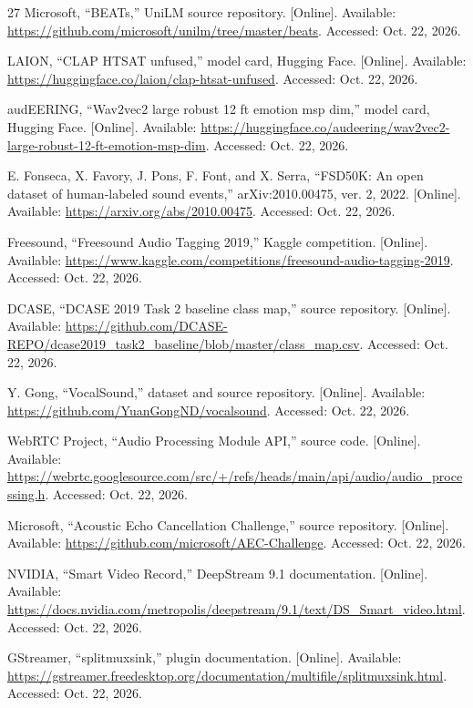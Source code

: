 \begin{thebibliography}{27}
Microsoft, ``BEATs,'' UniLM source repository. [Online]. Available: \url{https://github.com/microsoft/unilm/tree/master/beats}. Accessed: Oct. 22, 2026.

LAION, ``CLAP HTSAT unfused,'' model card, Hugging Face. [Online]. Available: \url{https://huggingface.co/laion/clap-htsat-unfused}. Accessed: Oct. 22, 2026.

audEERING, ``Wav2vec2 large robust 12 ft emotion msp dim,'' model card, Hugging Face. [Online]. Available: \url{https://huggingface.co/audeering/wav2vec2-large-robust-12-ft-emotion-msp-dim}. Accessed: Oct. 22, 2026.

E. Fonseca, X. Favory, J. Pons, F. Font, and X. Serra, ``FSD50K: An open dataset of human-labeled sound events,'' arXiv:2010.00475, ver. 2, 2022. [Online]. Available: \url{https://arxiv.org/abs/2010.00475}. Accessed: Oct. 22, 2026.

Freesound, ``Freesound Audio Tagging 2019,'' Kaggle competition. [Online]. Available: \url{https://www.kaggle.com/competitions/freesound-audio-tagging-2019}. Accessed: Oct. 22, 2026.

DCASE, ``DCASE 2019 Task 2 baseline class map,'' source repository. [Online]. Available: \url{https://github.com/DCASE-REPO/dcase2019_task2_baseline/blob/master/class_map.csv}. Accessed: Oct. 22, 2026.

Y. Gong, ``VocalSound,'' dataset and source repository. [Online]. Available: \url{https://github.com/YuanGongND/vocalsound}. Accessed: Oct. 22, 2026.

WebRTC Project, ``Audio Processing Module API,'' source code. [Online]. Available: \url{https://webrtc.googlesource.com/src/+/refs/heads/main/api/audio/audio_processing.h}. Accessed: Oct. 22, 2026.

Microsoft, ``Acoustic Echo Cancellation Challenge,'' source repository. [Online]. Available: \url{https://github.com/microsoft/AEC-Challenge}. Accessed: Oct. 22, 2026.

NVIDIA, ``Smart Video Record,'' DeepStream 9.1 documentation. [Online]. Available: \url{https://docs.nvidia.com/metropolis/deepstream/9.1/text/DS_Smart_video.html}. Accessed: Oct. 22, 2026.

GStreamer, ``splitmuxsink,'' plugin documentation. [Online]. Available: \url{https://gstreamer.freedesktop.org/documentation/multifile/splitmuxsink.html}. Accessed: Oct. 22, 2026.


\end{thebibliography}
